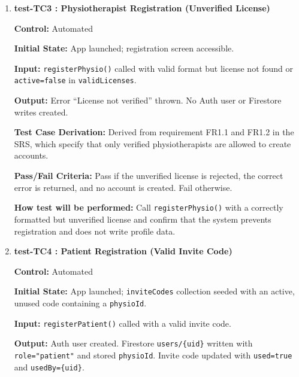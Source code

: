 \documentclass[12pt, titlepage]{article}
\begin{document}
\begin{enumerate}
	\textbf{Pass/Fail Criteria:} Pass if the invalid license is rejected, the correct error is thrown, and no account data is created. Fail otherwise.
	
	\textbf{How test will be performed:} Call \texttt{registerPhysio()} with incorrectly formatted license values and verify that registration fails and no user data is written to Firestore.
	
	
	\vspace{0.5em}
	
	\item \textbf{test-TC3 : Physiotherapist Registration (Unverified License)}
	
	\textbf{Control:} Automated
	
	\textbf{Initial State:} App launched; registration screen accessible.
	
	\textbf{Input:} \texttt{registerPhysio()} called with valid format but license not found or \texttt{active=false} in \texttt{validLicenses}.
	
	\textbf{Output:} Error ``License not verified'' thrown. No Auth user or Firestore writes created.
	
	\textbf{Test Case Derivation:} Derived from requirement FR1.1 and FR1.2 in the SRS, which specify that only verified physiotherapists are allowed to create accounts.
	
	\textbf{Pass/Fail Criteria:} Pass if the unverified license is rejected, the correct error is returned, and no account is created. Fail otherwise.
	
	\textbf{How test will be performed:} Call \texttt{registerPhysio()} with a correctly formatted but unverified license and confirm that the system prevents registration and does not write profile data.
	
	
	\vspace{0.5em}
	
	\item \textbf{test-TC4 : Patient Registration (Valid Invite Code)}
	
	\textbf{Control:} Automated
	
	\textbf{Initial State:} App launched; \texttt{inviteCodes} collection seeded with an active, unused code containing a \texttt{physioId}.
	
	\textbf{Input:} \texttt{registerPatient()} called with a valid invite code.
	
	\textbf{Output:} Auth user created. Firestore \texttt{users/\{uid\}} written with \texttt{role="patient"} and stored \texttt{physioId}. Invite code updated with \texttt{used=true} and \texttt{usedBy=\{uid\}}.
	

\end{enumerate}
\end{document}
